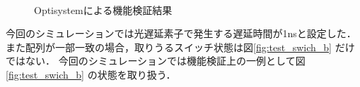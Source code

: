 \begin{figure}[t!]
\begin{center}
\\
\caption{Optisystemによる機能検証結果}
\label{fig:test}
\end{center}
\end{figure}
今回のシミュレーションでは光遅延素子で発生する遅延時間が1nsと設定した．
また配列が一部一致の場合，取りうるスイッチ状態は図\ref{fig:test_swich_b}
だけではない．
今回のシミュレーションでは機能検証上の一例として図\ref{fig:test_swich_b}
の状態を取り扱う．

